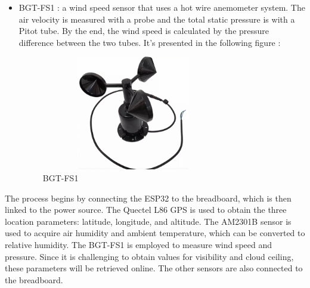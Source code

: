 \documentclass{report}
\begin{document}
\begin{itemize}
    \item  BGT-FS1 : a wind speed sensor that uses a hot wire anemometer system. The air velocity is measured with a probe and the total static pressure is with a Pitot tube. By the end, the wind speed is calculated by the pressure difference between the two tubes. It's presented in the following figure :
    \begin{figure}[h!]
  \centering
    \includegraphics[width=8cm, height=5cm] {BGT-FS1.png}
    \caption{BGT-FS1}
    \label{fig:my_label}
    \end{figure}\hfill \break
\end{itemize}
The process begins by connecting the ESP32 to the breadboard, which is then linked to the power source. The Quectel L86 GPS is used to obtain the three location parameters: latitude, longitude, and altitude. The AM2301B sensor is used to acquire air humidity and ambient temperature, which can be converted to relative humidity. The BGT-FS1 is employed to measure wind speed and pressure. Since it is challenging to obtain values for visibility and cloud ceiling, these parameters will be retrieved online. The other sensors are also connected to the breadboard.
\end{document}
